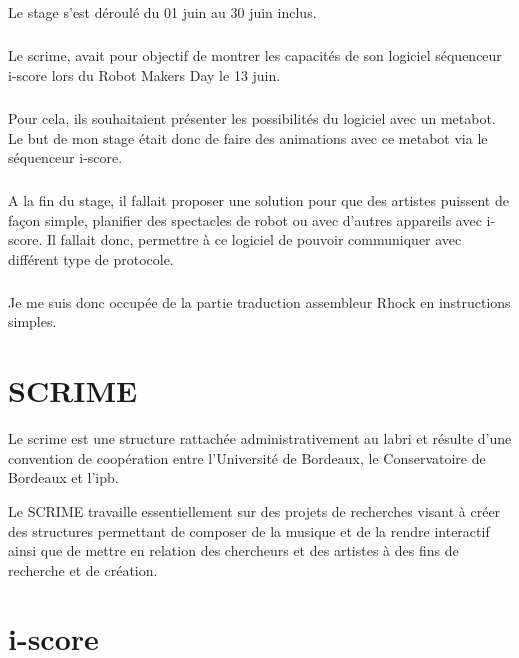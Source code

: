 \documentclass[10pt,a4paper]{report}
\begin{document}
\paragraph{}
Le stage s'est déroulé du 01 juin au 30 juin inclus.
\paragraph{}
Le \acrfull{scrime}, avait pour objectif de montrer les capacités de son logiciel séquenceur i-score lors du Robot Makers Day le 13 juin. 
\paragraph{}
Pour cela, ils souhaitaient présenter les possibilités du logiciel avec un metabot. Le but de mon stage était donc de faire des animations avec ce metabot via le séquenceur i-score. 
\paragraph{}
A la fin du stage, il fallait proposer une solution pour que des artistes puissent de façon simple, planifier des spectacles de robot ou avec d'autres appareils avec i-score. Il fallait donc, permettre à ce logiciel de pouvoir communiquer avec différent type de protocole.
\paragraph{}
Je me suis donc occupée de la partie traduction assembleur Rhock en instructions simples.



\chapter{SCRIME}
Le \acrshort{scrime} est une structure rattachée administrativement au  \acrfull{labri} et résulte d'une convention de coopération entre l'Université de Bordeaux, le Conservatoire de Bordeaux et l'\acrfull{ipb}.

Le SCRIME travaille essentiellement sur des projets de recherches visant à créer des structures permettant de composer de la musique et de la rendre interactif ainsi que  de mettre en relation des chercheurs et des artistes à des fins de recherche et de création.

\chapter{i-score}
\paragraph{}
\end{document}
